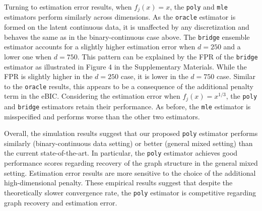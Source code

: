 Turning to estimation error results, when \(f_j(x) = x\), the \texttt{poly} and \texttt{mle} estimators perform similarly across dimensions. As the \texttt{oracle} estimator is formed on the latent continuous data, it is unaffected by any discretization and behaves the same as in the binary-continuous case above. The \texttt{bridge} ensemble estimator accounts for a slightly higher estimation error when \(d = 250\) and a lower one when \(d=750\). This pattern can be explained by the FPR of the \texttt{bridge} estimator as illustrated in Figure 4 in the Supplementary Materials. While the FPR is slightly higher in the \(d=250\) case, it is lower in the \(d=750\) case. Similar to the \texttt{oracle} results, this appears to be a consequence of the additional penalty term in the eBIC. Considering the estimation error when \(f_j(x) = x^{1/3}\), the \texttt{poly} and \texttt{bridge} estimators retain their performance. As before, the \texttt{mle} estimator is misspecified and performs worse than the other two estimators.

Overall, the simulation results suggest that our proposed \texttt{poly} estimator performs similarly (binary-continuous data setting) or better (general mixed setting) than the current state-of-the-art. In particular, the \texttt{poly} estimator achieves good performance scores regarding recovery of the graph structure in the general mixed setting. Estimation error results are more sensitive to the choice of the additional high-dimensional penalty. These empirical results suggest that despite the theoretically slower convergence rate, the \texttt{poly} estimator is competitive regarding graph recovery and estimation error.
